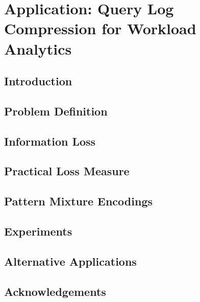 \chapter{Application: Query Log Compression for Workload Analytics}
\label{chapter:querylogsummarization}

\section{Introduction}


\section{Problem Definition}
\label{sec:problemdefinition}


\section{Information Loss}
\label{sec:analyzingsummaries}


\section{Practical Loss Measure}
\label{sec:practicalrepresentativeness}


\section{Pattern Mixture Encodings}


\section{Experiments}
\label{sec:experiments}


\section{Alternative Applications}
\label{sec:evaluatingalternativeapplications}


%

%

\balance

\section{Acknowledgements}
